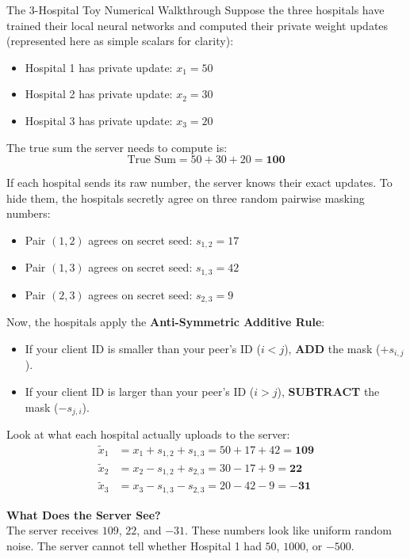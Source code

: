\documentclass[11pt,a4paper]{report}
\begin{document}
\begin{examplebox}{The 3-Hospital Toy Numerical Walkthrough}
Suppose the three hospitals have trained their local neural networks and computed their private weight updates (represented here as simple scalars for clarity):
\begin{itemize}[itemsep=1pt]
  \item Hospital 1 has private update: $x_1 = 50$
  \item Hospital 2 has private update: $x_2 = 30$
  \item Hospital 3 has private update: $x_3 = 20$
\end{itemize}
The true sum the server needs to compute is:
\begin{equation}
\text{True Sum} = 50 + 30 + 20 = \mathbf{100}
\end{equation}

If each hospital sends its raw number, the server knows their exact updates. To hide them, the hospitals secretly agree on three random pairwise masking numbers:
\begin{itemize}[itemsep=1pt]
  \item Pair $(1, 2)$ agrees on secret seed: $s_{1,2} = 17$
  \item Pair $(1, 3)$ agrees on secret seed: $s_{1,3} = 42$
  \item Pair $(2, 3)$ agrees on secret seed: $s_{2,3} = 9$
\end{itemize}

Now, the hospitals apply the \textbf{Anti-Symmetric Additive Rule}:
\begin{itemize}[itemsep=1pt]
  \item If your client ID is smaller than your peer's ID ($i < j$), \textbf{ADD} the mask ($+s_{i,j}$).
  \item If your client ID is larger than your peer's ID ($i > j$), \textbf{SUBTRACT} the mask ($-s_{j,i}$).
\end{itemize}

Look at what each hospital actually uploads to the server:
\begin{align}
\widetilde{x}_1 &= x_1 + s_{1,2} + s_{1,3} = 50 + 17 + 42 = \mathbf{109} \\
\widetilde{x}_2 &= x_2 - s_{1,2} + s_{2,3} = 30 - 17 + 9 = \mathbf{22} \\
\widetilde{x}_3 &= x_3 - s_{1,3} - s_{2,3} = 20 - 42 - 9 = \mathbf{-31}
\end{align}

\textbf{What Does the Server See?} \\
The server receives $109$, $22$, and $-31$. These numbers look like uniform random noise. The server cannot tell whether Hospital 1 had $50$, $1000$, or $-500$.


\end{examplebox}
\end{document}
